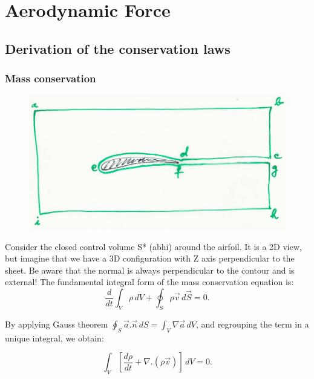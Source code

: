 
\chapter{Aerodynamic Force}
\section{Derivation of the conservation laws}
	\subsection{Mass conservation}
		
		\begin{figure}
		\vspace{-5mm}
		\includegraphics[scale=0.2]{ch1/1}
		\end{figure}
		Consider the closed control volume S* (abhi) around the airfoil. It is a 2D view, but imagine that we have a 3D configuration with Z axis perpendicular to the sheet. Be aware that the normal is always perpendicular to the contour and is external! The fundamental integral form of the mass conservation equation is:\\
		
		\begin{equation}
		\frac{d}{dt}\int _V \rho \, dV + \oint _S \rho \vec{v} \, d\vec{S} = 0.
		\end{equation}

		By applying Gauss theorem $\oint _S \vec{a}.\vec{n}\, dS = \int _V \nabla\vec{a}\, dV$, and regrouping the term in a unique integral, we obtain:
		
		\begin{equation}
		\int _V \left[\frac{d \rho}{d t} + \nabla .(\rho \vec{v})\right]\, dV = 0. 
		\end{equation}
		
